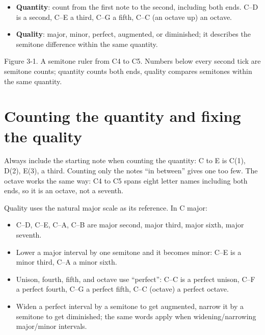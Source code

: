 \begin{itemize}
  \item \textbf{Quantity}: count from the first note to the second, including both ends. C--D is a second, C--E a third, C--G a fifth, C--C (an octave up) an octave.
  \item \textbf{Quality}: major, minor, perfect, augmented, or diminished; it describes the semitone difference within the same quantity.
\end{itemize}

\begin{center}

\small Figure 3-1. A semitone ruler from C4 to C5. Numbers below every second tick are semitone counts; quantity counts both ends, quality compares semitones within the same quantity.
\end{center}

\section{Counting the quantity and fixing the quality}

Always include the starting note when counting the quantity: C to E is C(1), D(2), E(3), a third. Counting only the notes ``in between'' gives one too few. The octave works the same way: C4 to C5 spans eight letter names including both ends, so it is an octave, not a seventh.

Quality uses the natural major scale as its reference. In C major:

\begin{itemize}
  \item C--D, C--E, C--A, C--B are major second, major third, major sixth, major seventh.
  \item Lower a major interval by one semitone and it becomes minor: C--E\flatsym{} is a minor third, C--A\flatsym{} a minor sixth.
  \item Unison, fourth, fifth, and octave use ``perfect'': C--C is a perfect unison, C--F a perfect fourth, C--G a perfect fifth, C--C (octave) a perfect octave.
  \item Widen a perfect interval by a semitone to get augmented, narrow it by a semitone to get diminished; the same words apply when widening/narrowing major/minor intervals.
\end{itemize}

